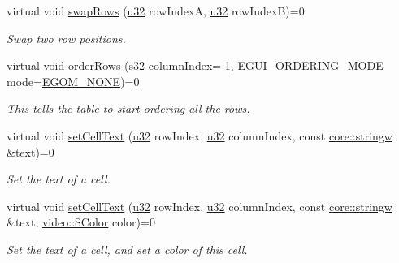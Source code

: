 \begin{DoxyCompactItemize}
virtual void \hyperlink{classirr_1_1gui_1_1IGUITable_a9b54731c433912b00b3393c98a53ca68}{swap\+Rows} (\hyperlink{namespaceirr_a0416a53257075833e7002efd0a18e804}{u32} row\+IndexA, \hyperlink{namespaceirr_a0416a53257075833e7002efd0a18e804}{u32} row\+IndexB)=0
\begin{DoxyCompactList}\small\item\em Swap two row positions. \end{DoxyCompactList}\item 
virtual void \hyperlink{classirr_1_1gui_1_1IGUITable_a22ec8c1ee8e6a191b8bdcd741b0144f2}{order\+Rows} (\hyperlink{namespaceirr_ac66849b7a6ed16e30ebede579f9b47c6}{s32} column\+Index=-\/1, \hyperlink{namespaceirr_1_1gui_a577bf3aa30c2e3bde9aa3eaa2e4f16d3}{E\+G\+U\+I\+\_\+\+O\+R\+D\+E\+R\+I\+N\+G\+\_\+\+M\+O\+DE} mode=\hyperlink{namespaceirr_1_1gui_a577bf3aa30c2e3bde9aa3eaa2e4f16d3afc9617a9d7600ff2bea753c6fe060ad0}{E\+G\+O\+M\+\_\+\+N\+O\+NE})=0
\begin{DoxyCompactList}\small\item\em This tells the table to start ordering all the rows. \end{DoxyCompactList}\item 
\mbox{\label{classirr_1_1gui_1_1IGUITable_a4e2445949ad689a3afca73d693d01e9c}} 
virtual void \hyperlink{classirr_1_1gui_1_1IGUITable_a4e2445949ad689a3afca73d693d01e9c}{set\+Cell\+Text} (\hyperlink{namespaceirr_a0416a53257075833e7002efd0a18e804}{u32} row\+Index, \hyperlink{namespaceirr_a0416a53257075833e7002efd0a18e804}{u32} column\+Index, const \hyperlink{namespaceirr_1_1core_a5aedb62cb47cf01d1c548ab5e6344d2d}{core\+::stringw} \&text)=0
\begin{DoxyCompactList}\small\item\em Set the text of a cell. \end{DoxyCompactList}\item 
\mbox{\label{classirr_1_1gui_1_1IGUITable_ab23ea414e2a01dd8ed8b3ab659318653}} 
virtual void \hyperlink{classirr_1_1gui_1_1IGUITable_ab23ea414e2a01dd8ed8b3ab659318653}{set\+Cell\+Text} (\hyperlink{namespaceirr_a0416a53257075833e7002efd0a18e804}{u32} row\+Index, \hyperlink{namespaceirr_a0416a53257075833e7002efd0a18e804}{u32} column\+Index, const \hyperlink{namespaceirr_1_1core_a5aedb62cb47cf01d1c548ab5e6344d2d}{core\+::stringw} \&text, \hyperlink{classirr_1_1video_1_1SColor}{video\+::\+S\+Color} color)=0
\begin{DoxyCompactList}\small\item\em Set the text of a cell, and set a color of this cell. \end{DoxyCompactList}\item 

\end{DoxyCompactItemize}
